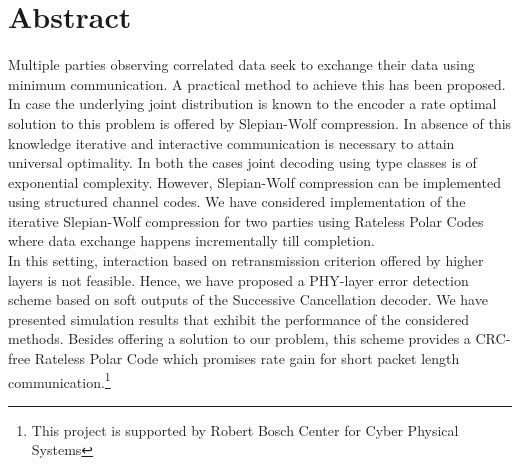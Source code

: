 \documentclass[
11pt, %
a4paper, %
oneside, %
headinclude,footinclude, %
BCOR5mm, %
]{scrartcl}
\begin{document}
\newpage


\setcounter{tocdepth}{2} %

\tableofcontents %
\newpage
\listoffigures

\newpage
\section*{Abstract}
Multiple parties observing correlated data seek to exchange their data using minimum communication. A practical method to achieve this has been proposed. \\In case the underlying joint distribution is known to the encoder a rate optimal solution to this problem is offered by Slepian-Wolf compression. In absence of this knowledge iterative and interactive communication is necessary to attain universal optimality. In both the cases joint decoding using type classes is of exponential complexity. However, Slepian-Wolf compression can be implemented using structured channel codes. We have considered implementation of the iterative Slepian-Wolf compression for two parties using Rateless Polar Codes where data exchange happens incrementally till completion. \\In this setting, interaction based on retransmission criterion offered by higher layers is not feasible.
Hence, we have  proposed a PHY-layer error detection scheme based on soft outputs of the Successive Cancellation decoder. We have presented simulation results that exhibit the performance of the considered methods.
Besides offering a solution to our problem, this scheme provides a CRC-free Rateless Polar Code which promises rate gain for short packet length communication.\footnote{This project is supported by Robert Bosch Center for Cyber Physical Systems}
 
\newpage
\end{document}

